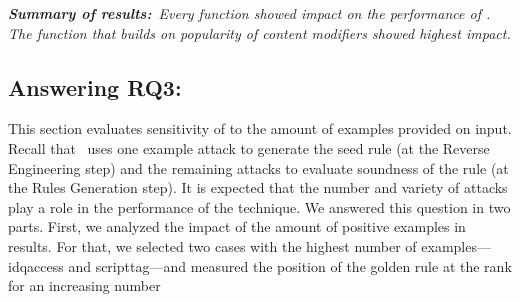 \documentclass[conference]{IEEEtran}
\begin{document}
\emph{\textbf{Summary of results:}~Every function showed impact on the
  performance of \tname. The function that builds on popularity of
  content modifiers showed highest impact.}


\subsection{Answering RQ3: \textRQthree}
\label{sec:answer-rqthree}

This section evaluates sensitivity of \tname{} to the amount of
examples provided on input. Recall that \tname\ uses one example
attack to generate the seed rule (at the Reverse Engineering step) and
the remaining attacks to evaluate soundness of the rule (at the Rules
Generation step). It is expected that the number and variety of attacks
play a role in the performance of the technique.  We answered this
question in two parts. First, we analyzed the impact of the amount of
positive examples in results. For that, we selected two cases with the
highest number of examples---idqaccess and scripttag---and measured
the position of the golden rule at the rank for an increasing number
\end{document}

